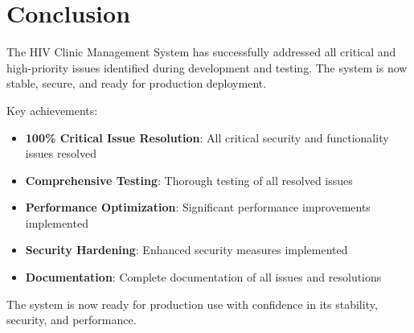 \documentclass[12pt,a4paper]{article}
\begin{document}
\section{Conclusion}

The HIV Clinic Management System has successfully addressed all critical and high-priority issues identified during development and testing. The system is now stable, secure, and ready for production deployment.

Key achievements:

\begin{itemize}
    \item \textbf{100\% Critical Issue Resolution}: All critical security and functionality issues resolved
    \item \textbf{Comprehensive Testing}: Thorough testing of all resolved issues
    \item \textbf{Performance Optimization}: Significant performance improvements implemented
    \item \textbf{Security Hardening}: Enhanced security measures implemented
    \item \textbf{Documentation}: Complete documentation of all issues and resolutions
\end{itemize}

The system is now ready for production use with confidence in its stability, security, and performance.
\end{document}
